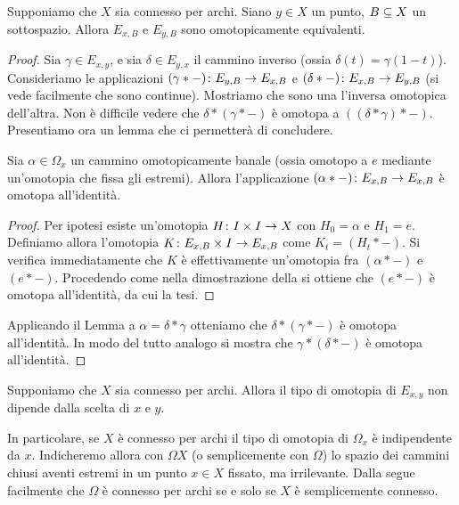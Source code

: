 \begin{proposition}
Supponiamo che $X$ sia connesso per archi. Siano $y\in X$ un punto, $B\subseteq X$ un sottospazio. Allora $E_{x,B}$ e $E_{y,B}$ sono omotopicamente equivalenti.
\end{proposition}
\begin{proof}
Sia $\gamma\in E_{x,y}$, e sia $\delta\in E_{y,x}$ il cammino inverso (ossia $\delta(t)=\gamma(1-t)$). Consideriamo le applicazioni $(\gamma\ast-)\colon E_{y,B}\to E_{x,B}$ e $(\delta\ast-)\colon E_{x,B}\to E_{y,B}$ (si vede facilmente che sono continue). Mostriamo che sono una l'inversa omotopica dell'altra. Non è difficile vedere che $\delta\ast(\gamma\ast-)$ è omotopa a $((\delta\ast\gamma)\ast-)$. Presentiamo ora un lemma  che ci permetterà di concludere.
\begin{lemma}
Sia $\alpha\in\Omega_x$ un cammino omotopicamente banale (ossia omotopo a $e$ mediante un'omotopia che fissa gli estremi). Allora l'applicazione $(\alpha\ast-)\colon E_{x,B}\to E_{x,B}$ è omotopa all'identità.
\end{lemma}
\begin{proof}
Per ipotesi esiste un'omotopia $H\colon I\times I\to X$ con $H_0=\alpha$ e $H_1=e$. Definiamo allora l'omotopia $K\colon E_{x,B}\times I\to E_{x,B}$ come $K_t=(H_t\ast-)$. Si verifica immediatamente che $K$ è effettivamente un'omotopia fra $(\alpha\ast-)$ e $(e\ast-)$. Procedendo come nella dimostrazione della  si ottiene che $(e\ast-)$ è omotopa all'identità, da cui la tesi.
\end{proof}
Applicando il Lemma a $\alpha=\delta\ast\gamma$ otteniamo che $\delta\ast(\gamma\ast-)$ è omotopa all'identità. In modo del tutto analogo si mostra che $\gamma\ast(\delta\ast-)$ è omotopa all'identità.
\end{proof}
\begin{corollary}
Supponiamo che $X$ sia connesso per archi. Allora il tipo di omotopia di $E_{x,y}$ non dipende dalla scelta di $x$ e $y$.
\end{corollary}
In particolare, se $X$ è connesso per archi il tipo di omotopia di $\Omega_x$ è indipendente da $x$. Indicheremo allora con $\Omega X$ (o semplicemente con $\Omega$) lo spazio dei cammini chiusi aventi estremi in un punto $x\in X$ fissato, ma irrilevante. Dalla  segue facilmente che $\Omega$ è connesso per archi se e solo se $X$ è semplicemente connesso.

